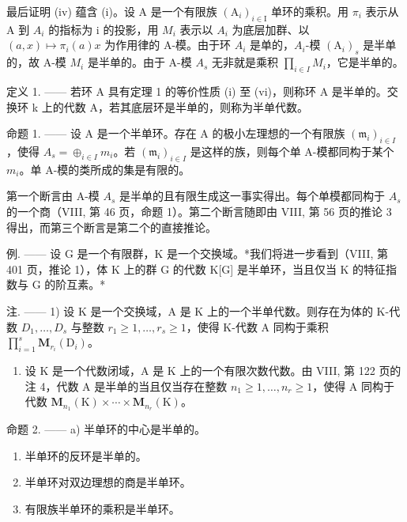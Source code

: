最后证明 (iv) 蕴含 (i)。设 A 是一个有限族 \((\mathrm{A}_{i})_{i\in\mathrm{I}}\) 单环的乘积。用 \(\pi_{i}\) 表示从 A 到 \(A_{i}\) 的指标为 i 的投影，用 \(M_{i}\) 表示以 \(A_{i}\) 为底层加群、以 \((a,x)\mapsto\pi_{i}(a)x\) 为作用律的 A-模。由于环 \(A_{i}\) 是单的，\(A_{i}\)-模 \((\mathrm{A}_{i})_{s}\) 是半单的，故 A-模 \(M_{i}\) 是半单的。由于 A-模 \(A_{s}\) 无非就是乘积 \(\prod_{i\in I}M_{i}\)，它是半单的。

定义 1. —— 若环 A 具有定理 1 的等价性质 (i) 至 (vi)，则称环 A 是半单的。交换环 k 上的代数 A，若其底层环是半单的，则称为半单代数。

命题 1. —— 设 A 是一个半单环。存在 A 的极小左理想的一个有限族 \((\mathfrak{m}_{i})_{i\in I}\)，使得 \(A_{s}=\oplus_{i\in I}m_{i}\)。若 \((\mathfrak{m}_{i})_{i\in I}\) 是这样的族，则每个单 A-模都同构于某个 \(m_{i}\)。单 A-模的类所成的集是有限的。

第一个断言由 A-模 \(A_{s}\) 是半单的且有限生成这一事实得出。每个单模都同构于 \(A_{s}\) 的一个商（VIII, 第 46 页，命题 1）。第二个断言随即由 VIII, 第 56 页的推论 3 得出，而第三个断言是第二个的直接推论。

例. —— 设 G 是一个有限群，K 是一个交换域。*我们将进一步看到（VIII, 第 401 页，推论 1），体 K 上的群 G 的代数 K{[}G{]} 是半单环，当且仅当 K 的特征指数与 G 的阶互素。*

注. —— 1) 设 K 是一个交换域，A 是 K 上的一个半单代数。则存在为体的 K-代数 \(D_{1},\ldots,D_{s}\) 与整数 \(r_{1}\geqslant1,\ldots,r_{s}\geqslant1\)，使得 K-代数 A 同构于乘积 \(\prod_{i=1}^{s}\mathbf{M}_{r_{i}}(\mathrm{D}_{i})\)。

\begin{enumerate}
\def\labelenumi{\arabic{enumi})}
\setcounter{enumi}{1}
\tightlist
\item
  设 K 是一个代数闭域，A 是 K 上的一个有限次数代数。由 VIII, 第 122 页的注 4，代数 A 是半单的当且仅当存在整数 \(n_{1} \geqslant 1, \ldots, n_{r} \geqslant 1\)，使得 A 同构于代数 \(\mathbf{M}_{n_{1}}(\mathrm{K}) \times \cdots \times \mathbf{M}_{n_{r}}(\mathrm{K})\)。
\end{enumerate}

命题 2. —— a) 半单环的中心是半单的。

\begin{enumerate}
\def\labelenumi{\alph{enumi})}
\setcounter{enumi}{1}
\item
  半单环的反环是半单的。
\item
  半单环对双边理想的商是半单环。
\item
  有限族半单环的乘积是半单环。
\end{enumerate}

